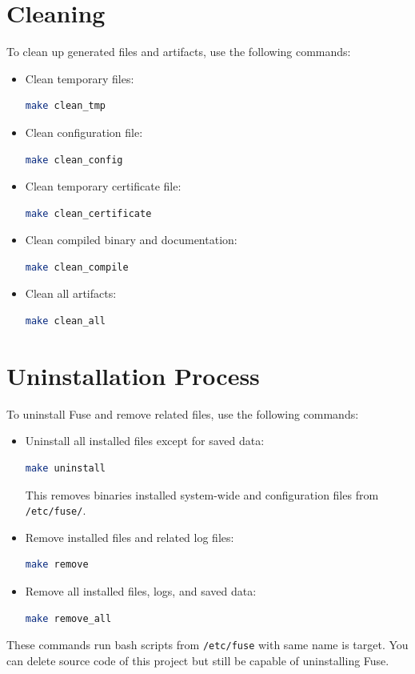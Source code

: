 \documentclass[a4paper,12pt]{article}
\begin{document}
\section{Cleaning}
To clean up generated files and artifacts, use the following commands:
\begin{itemize}
	\item Clean temporary files:
	      \begin{lstlisting}[language=bash]
make clean_tmp
	      \end{lstlisting}
	\item Clean configuration file:
	      \begin{lstlisting}[language=bash]
make clean_config
	      \end{lstlisting}
	\item Clean temporary certificate file:
	      \begin{lstlisting}[language=bash]
make clean_certificate
	      \end{lstlisting}
	\item Clean compiled binary and documentation:
	      \begin{lstlisting}[language=bash]
make clean_compile
	      \end{lstlisting}
	\item Clean all artifacts:
	      \begin{lstlisting}[language=bash]
make clean_all
	      \end{lstlisting}
\end{itemize}

\section{Uninstallation Process}
To uninstall Fuse and remove related files, use the following commands:

\begin{itemize}
	\item Uninstall all installed files except for saved data:
	      \begin{lstlisting}[language=bash]
make uninstall
          \end{lstlisting}
	      This removes binaries installed system-wide and configuration files from \texttt{/etc/fuse/}.

	\item Remove installed files and related log files:
	      \begin{lstlisting}[language=bash]
make remove
          \end{lstlisting}
	\item Remove all installed files, logs, and saved data:
	      \begin{lstlisting}[language=bash]
make remove_all
          \end{lstlisting}
\end{itemize}
These commands run bash scripts from \texttt{/etc/fuse} with same name is target. You can delete source code of this project but still be capable of uninstalling Fuse.
\end{document}
